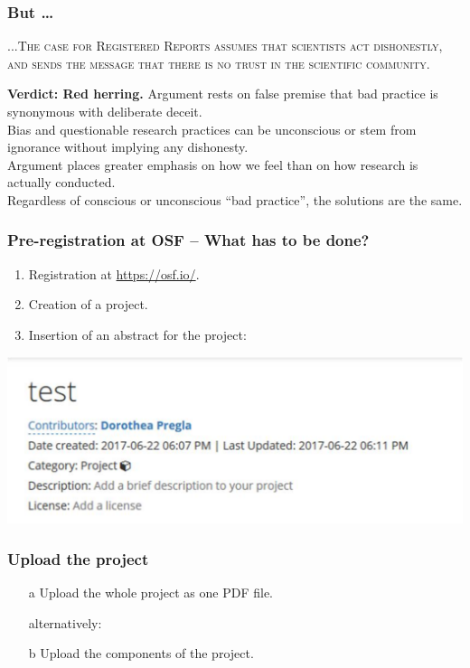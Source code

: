\documentclass{beamer}
\begin{document}

\begin{frame}
\frametitle{But \dots}

\textsc{...The case for Registered Reports assumes that scientists act dishonestly, and sends the message that there is no trust in the scientific community.}\\[12pt]

\pause

\textbf{Verdict: Red herring.}
Argument rests on false premise that bad practice is synonymous with deliberate deceit.\\ Bias and questionable research practices can be unconscious or stem from ignorance without implying any dishonesty.\\ Argument places greater emphasis on how we feel than on how research is actually conducted. \\
Regardless of conscious or unconscious ``bad practice'', the solutions are the same. 
\end{frame}





\begin{frame}
\frametitle{Pre-registration at OSF -- What has to be done?}
\begin{enumerate}
\item Registration at \url{https://osf.io/}.
\item Creation of a project.
\item Insertion of an abstract for the project:
\end{enumerate}
\begin{center}
\includegraphics[scale=0.4]{prereg1.pdf}
\end{center}
\end{frame}

\begin{frame}
\frametitle{Upload the project}
\begin{itemize}
		\item[a] Upload the whole project as one PDF file.
		\item[] alternatively:
		\item[b] Upload the components of the project.
\end{itemize}
\end{frame}
\end{document}
